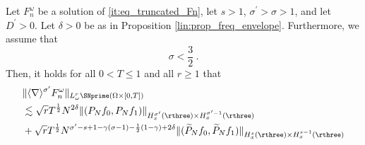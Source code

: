 \documentclass[11pt]{article}
\begin{document}
\begin{prop}\label{lin:prop_probabilistic_strichartz}
Let \( F_n^\omega \) be a solution of \eqref{it:eq_truncated_Fn}, let \( s>1 \), \( \sigma^\prime > \sigma > 1 \), and let \( D^\prime > 0 \).  Let \( \delta > 0 \) be as in Proposition \ref{lin:prop_freq_envelope}. Furthermore, we assume that \begin{equation}\label{lin:eq_consistency_condition_strichartz}
\sigma < \frac{3}{2}~. 
\end{equation}
Then, it holds for all \( 0 < T \leq 1 \) and all \( r \geq 1 \) that
\begin{equation}\label{lin:eq_probabilistic_strichartz}
\begin{aligned}
&\| \langle\nabla\rangle^{\sigma^\prime} F_n^\omega \|_{L_\omega^r \SNprime(\Omega \times [0,T])} \\
&\lesssim \sqrt{r} T^\frac{1}{2} N^{2\delta} \| (P_N f_0, P_N f_1) \|_{H_x^{\sigma^\prime}(\rthree)\times H_x^{\sigma^\prime-1}(\rthree)} \\
&+ \sqrt{r} T^{\frac{1}{2}} N^{\sigma^\prime -s +1- \gamma (\sigma-1) - \frac{1}{2} (1-\gamma) + 2\delta }  \| (\widetilde{P}_N f_0, \widetilde{P}_N f_1) \|_{H_x^s(\rthree)\times H_x^{s-1}(\rthree)}
\end{aligned}
\end{equation}
\end{prop}
\end{document}
